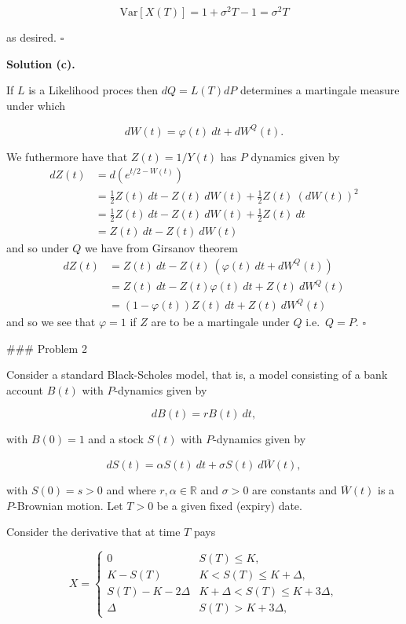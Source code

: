 \documentclass[a4paper,12pt,openany]{book}
\begin{document}
\[
\text{Var}[X(T)]=1+\sigma^2T-1=\sigma^2T
\]

as desired. \(\square\)

\noindent\makebox[\linewidth]{\rule{\textwidth}{0.4pt}}

\textbf{Solution (c).}

If \(L\) is a Likelihood proces then \(dQ=L(T)dP\) determines a martingale measure under which

\[
dW(t)=\varphi(t)\ dt+dW^Q(t).
\]

We futhermore have that \(Z(t)=1/Y(t)\) has \(P\) dynamics given by
\begin{align*}
dZ(t)&=d(e^{t/2-W(t)})\\
&=\frac{1}{2}Z(t)\ dt-Z(t)\ dW(t)+\frac{1}{2}Z(t)\ (dW(t))^2\\
&=\frac{1}{2}Z(t)\ dt-Z(t)\ dW(t)+\frac{1}{2}Z(t)\ dt\\
&=Z(t)\ dt-Z(t)\ dW(t)
\end{align*}
and so under \(Q\) we have from Girsanov theorem
\begin{align*}
dZ(t)&=Z(t)\ dt-Z(t)\ (\varphi(t)\ dt+dW^Q(t))\\
&=Z(t)\ dt-Z(t)\varphi(t)\ dt+Z(t)\ dW^Q(t)\\
&=(1-\varphi(t))Z(t)\ dt+Z(t)\ dW^Q(t)
\end{align*}
and so we see that \(\varphi =1\) if \(Z\) are to be a martingale under \(Q\) i.e.~\(Q=P\). \(\square\)

\noindent\makebox[\linewidth]{\rule{\textwidth}{0.4pt}}
\#\#\# Problem 2

Consider a standard Black-Scholes model, that is, a model consisting of a bank account \(B(t)\) with \(P\)-dynamics given by

\[
dB(t)=rB(t)\ dt,
\]

with \(B(0)=1\) and a stock \(S(t)\) with \(P\)-dynamics given by

\[
dS(t)=\alpha S(t)\ dt+\sigma S(t)\ d\overline{W}(t),
\]

with \(S(0)=s>0\) and where \(r,\alpha\in\mathbb{R}\) and \(\sigma >0\) are constants and \(\overline{W}(t)\) is a \(P\)-Brownian motion. Let \(T>0\) be a given fixed (expiry) date.

Consider the derivative that at time \(T\) pays

\[
X=\begin{cases}
0 & S(T)\le K,\\
K-S(T) & K<S(T)\le K+\Delta,\\
S(T)-K-2\Delta & K+\Delta<S(T)\le K+3\Delta,\\
\Delta & S(T)> K+3\Delta,
\end{cases}
\]
\end{document}
